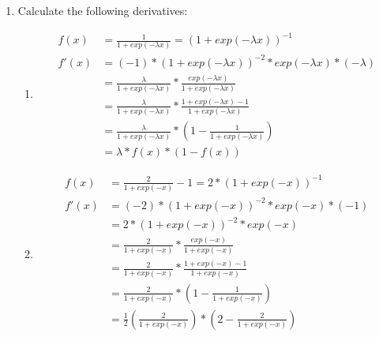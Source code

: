 \documentclass{article}
\begin{document}
\begin{enumerate}
\begin{enumerate}
\begin{center}
\begin{minipage}{8cm}
                    \end{minipage}
                \end{center}
        \end{enumerate}
        \newpage
    \item Calculate the following derivatives:
        \begin{enumerate}
            \item
                \begin{align*}
                    f(x) &= \frac{1}{1+exp(-\lambda x)}  = (1+exp(-\lambda
                    x))^{-1}\\
                    f'(x) &= (-1)*(1+exp(-\lambda x))^{-2}*exp(-\lambda
                    x)*(-\lambda)\\
                    &= \frac{\lambda}{1+exp(-\lambda x)}*\frac{exp(-\lambda
                x)}{1+exp(-\lambda x)}\\
                &= \frac{\lambda}{1+exp(-\lambda x)}*\frac{1+exp(-\lambda
            x)-1}{1+exp(-\lambda x)}\\
            &= \frac{\lambda}{1+exp(-\lambda x)}*(1-\frac{ 1}{1+exp(-\lambda
        x)})\\
        &= \lambda*f(x)*(1-f(x))
    \end{align*}
\item
    \begin{align*}
        f(x) &= \frac{2}{1+exp(-x)} -1  = 2*(1+exp(-x))^{-1}\\
        f'(x) &= (-2)*(1+exp(- x))^{-2}*exp(-x)*(-1)\\
              &= 2*(1+exp(- x))^{-2}*exp(-x) \\
              &= \frac{2}{1+exp(-x)}*\frac{exp(-x)}{1+exp(- x)}\\
              &= \frac{2}{1+exp(-x)}*\frac{1+exp(-x)-1}{1+exp(- x)}\\
              &= \frac{2}{1+exp(-x)}*(1-\frac{1}{1+exp(- x)})\\
              &= \frac{1}{2}(\frac{2}{1+exp(-x)})*(2-\frac{2}{1+exp(-x)})\\

\end{align*}
\end{enumerate}
\end{enumerate}
\end{document}
